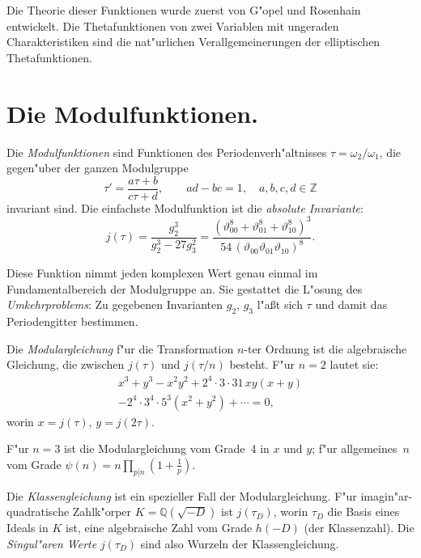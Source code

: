 \documentclass[12pt,a4paper]{article}
\theoremstyle{definition}
\begin{document}
Die Theorie dieser Funktionen wurde zuerst von G"opel und Rosenhain entwickelt. Die Thetafunktionen von zwei Variablen mit ungeraden Charakteristiken sind die nat"urlichen Verallgemeinerungen der elliptischen Thetafunktionen.

\newpage

\section{Die Modulfunktionen.}

Die \emph{Modulfunktionen} sind Funktionen des Periodenverh"altnisses $\tau = \omega_2/\omega_1$, die gegen"uber der ganzen Modulgruppe
\begin{equation}\tag{1}
\tau' = \frac{a\tau + b}{c\tau + d},\qquad ad - bc = 1,\quad a,b,c,d \in \mathbb{Z}
\end{equation}
invariant sind. Die einfachste Modulfunktion ist die \emph{absolute Invariante}:
\begin{equation}\tag{2}
j(\tau) = \frac{g_2^3}{g_2^3 - 27g_3^2} = \frac{(\vartheta_{00}^8 + \vartheta_{01}^8 + \vartheta_{10}^8)^3}{54\,(\vartheta_{00}\vartheta_{01}\vartheta_{10})^8}.
\end{equation}

Diese Funktion nimmt jeden komplexen Wert genau einmal im Fundamentalbereich der Modulgruppe an. Sie gestattet die L"osung des \emph{Umkehrproblems}: Zu gegebenen Invarianten $g_2$, $g_3$ l"a\ss{}t sich $\tau$ und damit das Periodengitter bestimmen.

Die \emph{Modulargleichung} f"ur die Transformation $n$-ter Ordnung ist die algebraische Gleichung, die zwischen $j(\tau)$ und $j(\tau/n)$ besteht. F"ur $n = 2$ lautet sie:
\begin{multline}\tag{3}
x^3 + y^3 - x^2y^2 + 2^4\cdot 3\cdot 31\,xy(x+y)\\
- 2^4\cdot 3^4\cdot 5^3(x^2+y^2) + \cdots = 0,
\end{multline}
worin $x = j(\tau)$, $y = j(2\tau)$.

\newpage

F"ur $n = 3$ ist die Modulargleichung vom Grade~4 in $x$ und $y$; f"ur allgemeines~$n$ vom Grade $\psi(n) = n\prod_{p|n}(1+\frac{1}{p})$.

Die \emph{Klassengleichung} ist ein spezieller Fall der Modulargleichung. F"ur imagin"ar-quadratische Zahlk"orper $K = \mathbb{Q}(\sqrt{-D})$ ist $j(\tau_D)$, worin $\tau_D$ die Basis eines Ideals in $K$ ist, eine algebraische Zahl vom Grade $h(-D)$ (der Klassenzahl). Die \emph{Singul"aren Werte} $j(\tau_D)$ sind also Wurzeln der Klassengleichung.
\end{document}
